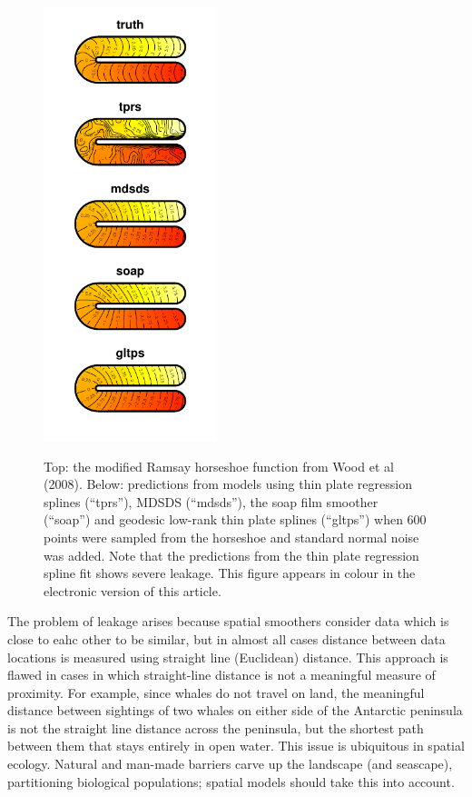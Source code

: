 \documentclass[useAMS, referee]{biom}
\begin{document}
\begin{figure}
\centering
\includegraphics[width=0.45\textwidth]{examples/ramsay/ramsay-real.pdf}\\
\caption{Top: the modified Ramsay horseshoe function from Wood et al (2008). Below: predictions from models using thin plate regression splines (``tprs''), MDSDS (``mdsds''), the soap film smoother (``soap'') and geodesic low-rank thin plate splines (``gltps'') when 600 points were sampled from the horseshoe and standard normal noise was added. Note that the predictions from the thin plate regression spline fit shows severe leakage. This figure appears in colour in the electronic version of this article.}
\label{leakage}
\end{figure}


The problem of leakage arises because spatial smoothers consider data which is close to eahc other to be similar, but in almost all cases distance between data locations is measured using straight line (Euclidean) distance. This approach is flawed in cases in which straight-line distance is not a meaningful measure of proximity. For example, since whales do not travel on land, the meaningful distance between sightings of two whales on either side of the Antarctic peninsula is not the straight line distance across the peninsula, but the shortest path between them that stays entirely in open water. This issue is ubiquitous in spatial ecology. Natural and man-made barriers carve up the landscape (and seascape), partitioning biological populations; spatial models should take this into account. 
\end{document}
